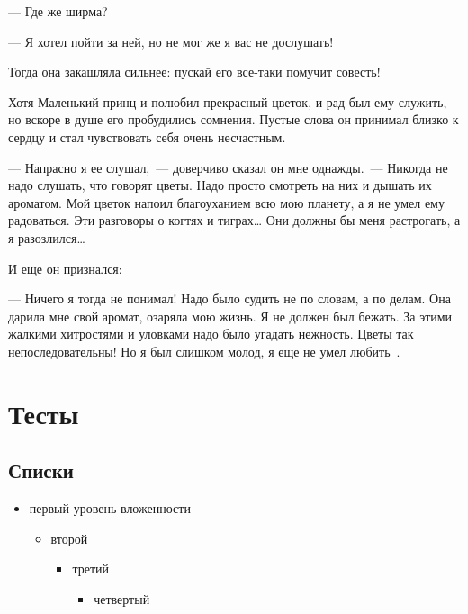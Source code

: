 \documentclass[14pt, a4paper, titlepage]{extarticle}
\begin{document}
--- Где же ширма?

--- Я хотел пойти за ней, но не мог же я вас не дослушать!

Тогда она закашляла сильнее: пускай его все-таки помучит совесть!

Хотя Маленький принц и полюбил прекрасный цветок, и рад был ему служить, но вскоре в душе его пробудились сомнения. Пустые слова он принимал близко к сердцу и стал чувствовать себя очень несчастным.

--- Напрасно я ее слушал,~--- доверчиво сказал он мне однажды.~--- Никогда не надо слушать, что говорят цветы. Надо просто смотреть на них и дышать их ароматом. Мой цветок напоил благоуханием всю мою планету, а я не умел ему радоваться. Эти разговоры о когтях и тиграх\dots{} Они должны бы меня растрогать, а я разозлился\dots{}

И еще он признался:

--- Ничего я тогда не понимал! Надо было судить не по словам, а по делам. Она дарила мне свой аромат, озаряла мою жизнь. Я не должен был бежать. За этими жалкими хитростями и уловками надо было угадать нежность. Цветы так непоследовательны! Но я был слишком молод, я еще не умел любить~\cite{bib:prince}.



\section{Тесты}

\subsection{Списки}
 
\begin{itemize}
    \item первый уровень вложенности
    \begin{itemize}
        \item второй
        \begin{itemize}
            \item третий
            \begin{itemize}
                \item четвертый
            \end{itemize}
        \end{itemize}
    \end{itemize}
\end{itemize}
 
\end{document}
